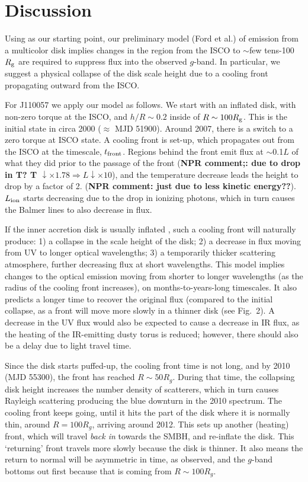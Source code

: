 \documentclass{nature}
\begin{document}
\section{Discussion}   
Using \cite{Sirko_Goodman2003} as our starting point, our preliminary
model (Ford et al.) of emission from a multicolor disk implies changes
in the region from the ISCO to $\sim$few tens-100 $R_{\rm g}$ are
required to suppress flux into the observed $g$-band. In particular,
we suggest a physical collapse of the disk scale height due to a
cooling front propagating outward from the ISCO.

For J110057 we apply our model as follows. We start with an inflated
disk, with non-zero torque at the ISCO, and $h/R\sim0.2$ inside of
$R\sim100 R_{\rm g}$.  This is the initial state in circa 2000
($\approx$ MJD 51900).  Around 2007, there is a switch to a zero
torque at ISCO state. A cooling front is set-up, which propagates out
from the ISCO at the timescale, $t_{\rm front}$. Regions behind the
front emit flux at $\sim$0.1$L$ of what they did prior to the passage
of the front ({\bf NPR comment;: due to drop in T?  T $\downarrow
\times 1.78 \Rightarrow L \downarrow \times10$}), and the temperature
decrease leads the height to drop by a factor of 2.  ({\bf NPR
comment: just due to less kinetic energy??}).  $L_{\rm ion}$ starts
decreasing due to the drop in ionizing photons, which in turn causes
the Balmer lines to also decrease in flux.

If the inner accretion disk is usually inflated \cite[e.g.,
see][]{Sirko_Goodman2003, Thompson2005, Hopkins_Quataert2011}, such a
cooling front will naturally produce: 1) a collapse in the scale
height of the disk; 2) a decrease in flux moving from UV to longer
optical wavelengths; 3) a temporarily thicker scattering atmosphere,
further decreasing flux at short wavelengths.  This model implies
changes to the optical emission moving from shorter to longer
wavelengths (as the radius of the cooling front increases), on
months-to-years-long timescales. It also predicts a longer time to
recover the original flux (compared to the initial collapse, as a
front will move more slowly in a thinner disk (see Fig.~2). A decrease
in the UV flux would also be expected to cause a decrease in IR flux,
as the heating of the IR-emitting dusty torus is reduced; however,
there should also be a delay due to light travel time.

Since the disk starts puffed-up, the cooling front time is not long,
and by 2010 (MJD 55300), the front has reached $R\sim50 R_{g}$. During
that time, the collapsing disk height increases the number density of
scatterers, which in turn causes Rayleigh scattering producing the
blue downturn in the 2010 spectrum.  The cooling front keeps going,
until it hits the part of the disk where it is normally thin, around
$R=100 R_g$, arriving around 2012. This sets up another (heating)
front, which will travel {\it back in} towards the SMBH, and
re-inflate the disk. This `returning' front travels more slowly
because the disk is thinner. It also means the return to normal will
be asymmetric in time, as observed, and the $g$-band bottoms out first
because that is coming from $R\sim100R_{g}$.
\end{document}
